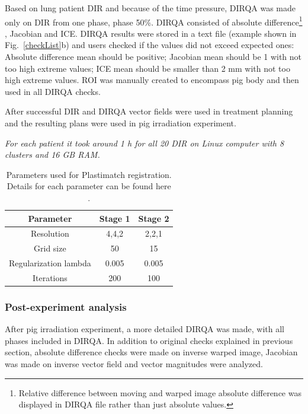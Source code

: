 \documentclass[type=dr, dr=rernat, accentcolor=tud7b,colorbacktitle, bigchapter, openright, twoside, 12pt ]{tudthesis}
\begin{document}
Based on lung patient DIR and because of the time pressure, DIRQA was made only on DIR from one phase, phase 50\%. DIRQA consisted of absolute difference\footnote{Relative difference between moving and warped image absolute difference was displayed in DIRQA file rather than just absolute values.} 
, Jacobian and ICE. DIRQA results were stored in a text file (example shown in Fig.~\ref{checkList}b) and users checked if the values did not exceed expected ones: Absolute difference
mean should be positive; Jacobian mean should be 1 with not too high extreme values; ICE mean should be smaller than 2 mm with not too high extreme values. ROI was manually created to encompass pig body and then used in all DIRQA checks.

After successful DIR and DIRQA vector fields were used in treatment planning and the resulting plans were used in pig irradiation experiment.

\textit{For each patient it took around 1 h for all 20 DIR on Linux computer with 8 clusters and 16 GB RAM.}

\begin{table}[H]
  \centering
  \caption{Parameters used for Plastimatch registration. Details for each parameter can be found here \cite{Plastimatch}.}
  \begin{tabular}{c|c|c}
      Parameter & Stage 1 & Stage 2 \\
      \hline
      Resolution & 4,4,2 & 2,2,1 \\
      Grid size & 50 & 15 \\
      Regularization lambda & 0.005 & 0.005 \\
      Iterations & 200 & 100 \\
    \hline\hline
  \end{tabular}
  \label{tab:stages2}
\end{table}

\subsubsection{Post-experiment analysis}

After pig irradiation experiment, a more detailed DIRQA was made, with all phases included in DIRQA. In addition to original checks explained in previous section, absolute difference checks were made on inverse warped image, 
Jacobian was made on inverse vector field and vector magnitudes were analyzed.
\end{document}

